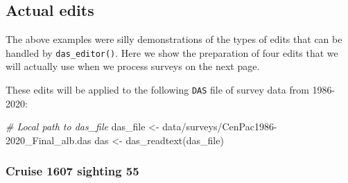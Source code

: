 \documentclass[
]{book}
\newenvironment{Shaded}{\begin{snugshade}}{\end{snugshade}}
\newcommand{\AttributeTok}[1]{\textcolor[rgb]{0.77,0.63,0.00}{#1}}
\newcommand{\CommentTok}[1]{\textcolor[rgb]{0.56,0.35,0.01}{\textit{#1}}}
\newcommand{\DecValTok}[1]{\textcolor[rgb]{0.00,0.00,0.81}{#1}}
\newcommand{\FunctionTok}[1]{\textcolor[rgb]{0.00,0.00,0.00}{#1}}
\newcommand{\NormalTok}[1]{#1}
\newcommand{\OtherTok}[1]{\textcolor[rgb]{0.56,0.35,0.01}{#1}}
\newcommand{\SpecialCharTok}[1]{\textcolor[rgb]{0.00,0.00,0.00}{#1}}
\newcommand{\StringTok}[1]{\textcolor[rgb]{0.31,0.60,0.02}{#1}}
\begin{document}
\begin{Shaded}
\end{Shaded}

\hypertarget{actual-edits}{%
\subsection*{Actual edits}\label{actual-edits}}

The above examples were silly demonstrations of the types of edits that can be handled by \texttt{das\_editor()}. Here we show the preparation of four edits that we will actually use when we process surveys on the next page.

These edits will be applied to the following \texttt{DAS} file of survey data from 1986-2020:

\begin{Shaded}
\begin{Highlighting}[]
\CommentTok{\# Local path to das\_file}
\NormalTok{das\_file }\OtherTok{\textless{}{-}} \StringTok{\textquotesingle{}data/surveys/CenPac1986{-}2020\_Final\_alb.das\textquotesingle{}}
\NormalTok{das }\OtherTok{\textless{}{-}} \FunctionTok{das\_readtext}\NormalTok{(das\_file)}
\end{Highlighting}
\end{Shaded}

\hypertarget{cruise-1607-sighting-55}{%
\subsubsection*{Cruise 1607 sighting 55}\label{cruise-1607-sighting-55}}
\end{document}
